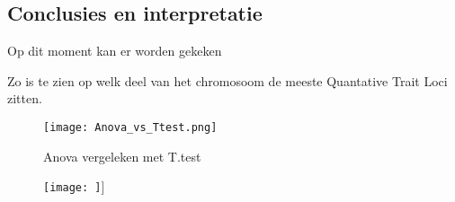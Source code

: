 \documentclass[12pt,a4paper, twocolumn]{article}
\begin{document}
\subsection*{Conclusies en interpretatie}
Op dit moment kan er worden gekeken 



Zo is te zien op welk deel van het chromosoom de meeste Quantative Trait Loci zitten.

\listoffigures
\begin{figure}
\hspace{-1.5cm}
\texttt{[image: Anova\_vs\_Ttest.png]}
\caption{Anova vergeleken met T.test}
\end{figure}
\begin{figure}
\vspace{2ex}
\hspace{-1.5ex}
\texttt{[image: ]}]
\end{figure}
\end{document}
